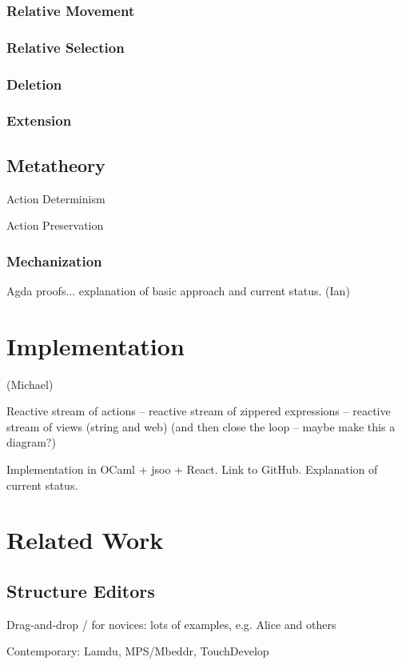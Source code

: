 \documentclass{llncs}
\begin{document}
\subsubsection{Relative Movement}

\subsubsection{Relative Selection}

\subsubsection{Deletion}

\subsubsection{Extension}

\subsection{Metatheory}
Action Determinism

Action Preservation

\subsubsection{Mechanization}
Agda proofs... explanation of basic approach and current status. (Ian)

\section{Implementation}
(Michael)

Reactive stream of actions -- reactive stream of zippered expressions -- reactive stream of views (string and web) (and then close the loop -- maybe make this a diagram?) 

Implementation in OCaml + jsoo + React. Link to GitHub. Explanation of current status.


\section{Related Work}
\subsection{Structure Editors}
Drag-and-drop / for novices: lots of examples, e.g. Alice and others

Contemporary: Lamdu, MPS/Mbeddr, TouchDevelop
\end{document}
